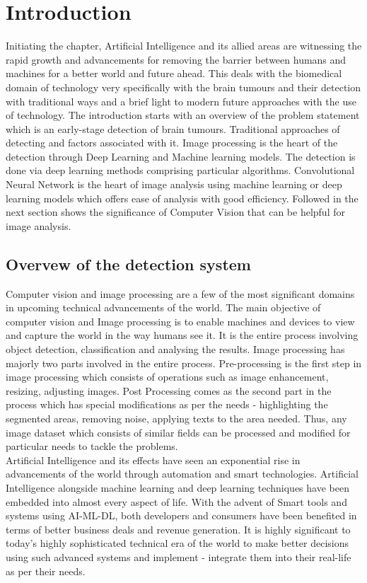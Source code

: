 \chapter{Introduction}
Initiating the chapter, Artificial Intelligence and its allied areas are witnessing the rapid growth and advancements for removing the barrier between humans and machines for a better world and future ahead. This deals with the biomedical domain of technology very specifically with the brain tumours and their detection with traditional ways and a brief light to modern future approaches with the use of technology. The introduction starts with an overview of the problem statement which is an early-stage detection of brain tumours. Traditional approaches of detecting and factors associated with it. Image processing is the heart of the detection through Deep Learning and Machine learning models. The detection is done via deep learning methods comprising particular algorithms. Convolutional Neural Network is the heart of image analysis using machine learning or deep learning models which offers ease of analysis with good efficiency. Followed in the next section shows the significance of Computer Vision that can be helpful for image analysis. 
\section{Overvew of the detection system}

{Computer vision and image processing are a few of the most significant domains in upcoming technical advancements of the world. The main objective of computer vision and Image processing is to enable machines and devices to view and capture the world in the way humans see it. It is the entire process involving object detection, classification and analysing the results. Image processing has majorly two parts involved in the entire process. Pre-processing is the first step in image processing which consists of operations such as image enhancement, resizing, adjusting images. Post Processing comes as the second part in the process which has special modifications as per the needs - highlighting the segmented areas, removing noise, applying texts to the area needed. Thus, any image dataset which consists of similar fields can be processed and modified for particular needs to tackle the problems.}\\

{Artificial Intelligence and its effects have seen an exponential rise in advancements of the world through automation and smart technologies. Artificial Intelligence alongside machine learning and deep learning techniques have been embedded into almost every aspect of life. With the advent of Smart tools and systems using AI-ML-DL, both developers and consumers have been benefited in terms of better business deals and revenue generation. It is highly significant to today's highly sophisticated technical era of the world to make better decisions using such advanced systems and implement - integrate them into their real-life as per their needs.}\\

